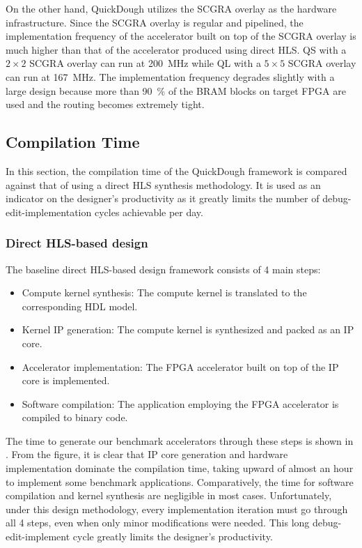 On the other hand, QuickDough utilizes the SCGRA overlay as the hardware infrastructure. Since the
SCGRA overlay is regular and pipelined, the implementation frequency of the accelerator built on top
of the SCGRA overlay is much higher than that of the accelerator produced using direct HLS. QS with
a $2\times 2$ SCGRA overlay can run at \SI{200}{\mega\hertz} while QL with a $5 \times 5$ SCGRA
overlay can run at \SI{167}{\mega\hertz}. The implementation frequency degrades slightly
with a large design because more than \SI{90}{\percent} of the BRAM blocks on target FPGA are used
and the routing becomes extremely tight. 

\subsection{Compilation Time} \label{subsec:compilation}
In this section, the compilation time of the QuickDough framework is compared against that of using a direct HLS synthesis methodology.  It is used as an indicator on the designer's productivity as it greatly limits the number of debug-edit-implementation cycles achievable per day.

\subsubsection{Direct HLS-based design}
The baseline direct HLS-based design framework consists of 4 main steps:
 
\begin{itemize}[label=\textbullet,leftmargin=2em,rightmargin=\leftmargin]
\item Compute kernel synthesis: The compute kernel is translated to the corresponding HDL model.
\item Kernel IP generation: The compute kernel is synthesized and packed as an IP core.
\item Accelerator implementation: The FPGA accelerator built on top of the IP core is implemented. 
\item Software compilation: The application employing the FPGA accelerator is compiled to binary code.
\end{itemize}

The time to generate our benchmark accelerators through these steps is shown in .
From the figure, it is clear that IP core generation and hardware implementation dominate the compilation time, taking upward of almost an hour to implement some benchmark applications.
Comparatively, the time for software compilation and kernel synthesis are negligible in most cases.
Unfortunately, under this design methodology, every implementation iteration must go through all 4 steps, even when only minor modifications were needed.
This long debug-edit-implement cycle greatly limits the designer's productivity.

